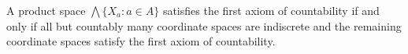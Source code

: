 A product space $\bigwedge \{X_a : a \in A\}$ satisfies the first axiom of countability if and only if all but countably many coordinate spaces are indiscrete and the remaining coordinate spaces satisfy the first axiom of countability.
